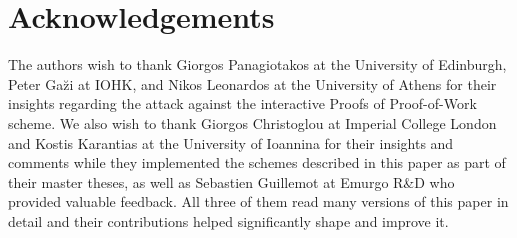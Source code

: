 \ifanonymous\else
\section{Acknowledgements}
The authors wish to thank Giorgos Panagiotakos at the University of Edinburgh,
Peter Ga\u{z}i at IOHK, and Nikos Leonardos at the University of Athens for
their insights regarding the attack against the interactive Proofs of
Proof-of-Work scheme. We also wish to thank Giorgos Christoglou at Imperial
College London and Kostis Karantias at the University of Ioannina for their
insights and comments while they implemented the schemes described in this paper
as part of their master theses, as well as Sebastien Guillemot at Emurgo R\&D
who provided valuable feedback. All three of them read many versions of this
paper in detail and their contributions helped significantly shape and improve
it.
\fi
